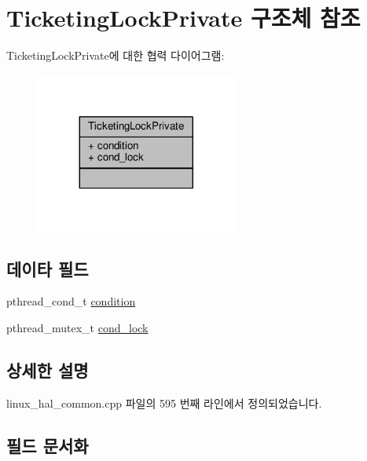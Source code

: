 \hypertarget{struct_ticketing_lock_private}{}\section{Ticketing\+Lock\+Private 구조체 참조}
\label{struct_ticketing_lock_private}


Ticketing\+Lock\+Private에 대한 협력 다이어그램\+:
\nopagebreak
\begin{figure}[H]
\begin{center}
\leavevmode
\includegraphics[width=188pt]{struct_ticketing_lock_private__coll__graph}
\end{center}
\end{figure}
\subsection*{데이타 필드}
\begin{DoxyCompactItemize}
\item 
pthread\+\_\+cond\+\_\+t \hyperlink{struct_ticketing_lock_private_a2d017047068ee847b500c14427ac4d6b}{condition}
\item 
pthread\+\_\+mutex\+\_\+t \hyperlink{struct_ticketing_lock_private_ae3e5051fe73e5989a4d275ba3f947f64}{cond\+\_\+lock}
\end{DoxyCompactItemize}


\subsection{상세한 설명}


linux\+\_\+hal\+\_\+common.\+cpp 파일의 595 번째 라인에서 정의되었습니다.



\subsection{필드 문서화}

